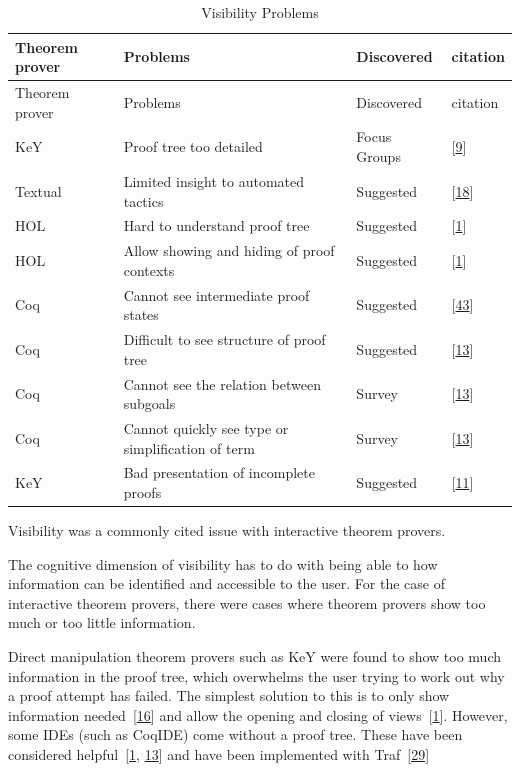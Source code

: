 \documentclass[
]{article}
\begin{document}
\hypertarget{tbl:visibility}{}
\begin{longtable}[]{@{}llll@{}}
\caption{\label{tbl:visibility}Visibility Problems}\tabularnewline
\toprule
Theorem prover & Problems & Discovered & citation \\
\midrule
\endfirsthead
\toprule
Theorem prover & Problems & Discovered & citation \\
\midrule
\endhead
KeY & Proof tree too detailed & Focus Groups &
{[}\protect\hyperlink{ref-beckert_usability_2015}{9}{]} \\
Textual & Limited insight to automated tactics & Suggested &
{[}\protect\hyperlink{ref-grebing_usability_2020}{18}{]} \\
HOL & Hard to understand proof tree & Suggested &
{[}\protect\hyperlink{ref-aitken_interactive_1998}{1}{]} \\
HOL & Allow showing and hiding of proof contexts & Suggested &
{[}\protect\hyperlink{ref-aitken_interactive_1998}{1}{]} \\
Coq & Cannot see intermediate proof states & Suggested &
{[}\protect\hyperlink{ref-zacchiroli_user_2007}{43}{]} \\
Coq & Difficult to see structure of proof tree & Suggested &
{[}\protect\hyperlink{ref-berman_development_2014}{13}{]} \\
Coq & Cannot see the relation between subgoals & Survey &
{[}\protect\hyperlink{ref-berman_development_2014}{13}{]} \\
Coq & Cannot quickly see type or simplification of term & Survey &
{[}\protect\hyperlink{ref-berman_development_2014}{13}{]} \\
KeY & Bad presentation of incomplete proofs & Suggested &
{[}\protect\hyperlink{ref-beckert_evaluating_2012}{11}{]} \\
\bottomrule
\end{longtable}

Visibility was a commonly cited issue with interactive theorem provers.

The cognitive dimension of visibility has to do with being able to how
information can be identified and accessible to the user. For the case
of interactive theorem provers, there were cases where theorem provers
show too much or too little information.

Direct manipulation theorem provers such as KeY were found to show too
much information in the proof tree, which overwhelms the user trying to
work out why a proof attempt has failed. The simplest solution to this
is to only show information
needed~{[}\protect\hyperlink{ref-eastaughffe_support_1998}{16}{]} and
allow the opening and closing of
views~{[}\protect\hyperlink{ref-aitken_interactive_1998}{1}{]}. However,
some IDEs (such as CoqIDE) come without a proof tree. These have been
considered
helpful~{[}\protect\hyperlink{ref-aitken_interactive_1998}{1},
\protect\hyperlink{ref-berman_development_2014}{13}{]} and have been
implemented with
Traf~{[}\protect\hyperlink{ref-kawabata_traf_2018}{29}{]}
\end{document}
